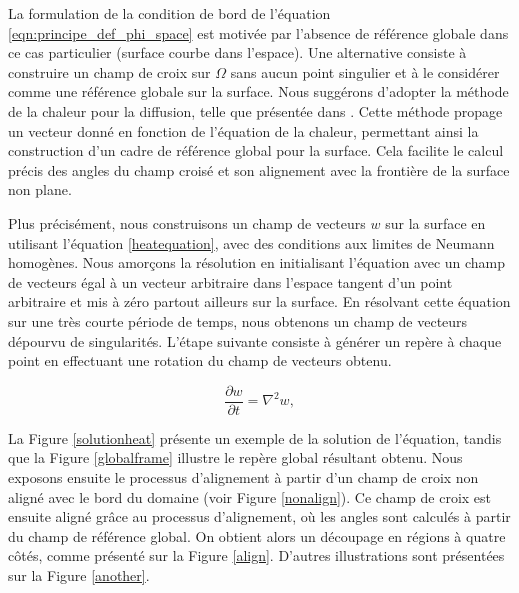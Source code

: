 La formulation de la condition de bord de l'équation \ref{eqn:principe_def_phi_space} est motivée par l'absence de référence globale dans ce cas particulier (surface courbe dans l'espace). Une alternative consiste à construire un champ de croix sur $\Omega$ sans aucun point singulier et à le considérer comme une référence globale sur la surface. Nous suggérons d'adopter la méthode de la chaleur pour la diffusion, telle que présentée dans \cite{sharp2019vector}. Cette méthode propage un vecteur donné en fonction de l'équation de la chaleur, permettant ainsi la construction d'un cadre de référence global pour la surface. Cela facilite le calcul précis des angles du champ croisé et son alignement avec la frontière de la surface non plane.

Plus précisément, nous construisons un champ de vecteurs $w$ sur la surface en utilisant l'équation \eqref{heatequation}, avec des conditions aux limites de Neumann homogènes. Nous amorçons la résolution en initialisant l'équation avec un champ de vecteurs égal à un vecteur arbitraire dans l'espace tangent d'un point arbitraire et mis à zéro partout ailleurs sur la surface. En résolvant cette équation sur une très courte période de temps, nous obtenons un champ de vecteurs dépourvu de singularités. L'étape suivante consiste à générer un repère à chaque point en effectuant une rotation du champ de vecteurs obtenu.

\begin{equation}
\label{heatequation}
\frac{\partial w}{\partial t} = \nabla^2 w,
\end{equation}

La Figure \ref{solutionheat} présente un exemple de la solution de l'équation, tandis que la Figure \ref{globalframe} illustre le repère global résultant obtenu. Nous exposons ensuite le processus d'alignement à partir d'un champ de croix non aligné avec le bord du domaine (voir Figure \ref{nonalign}). Ce champ de croix est ensuite aligné grâce au processus d'alignement, où les angles sont calculés à partir du champ de référence global. On obtient alors un découpage en régions à quatre côtés, comme présenté sur la Figure \ref{align}. D'autres illustrations sont présentées sur la Figure \ref{another}.

